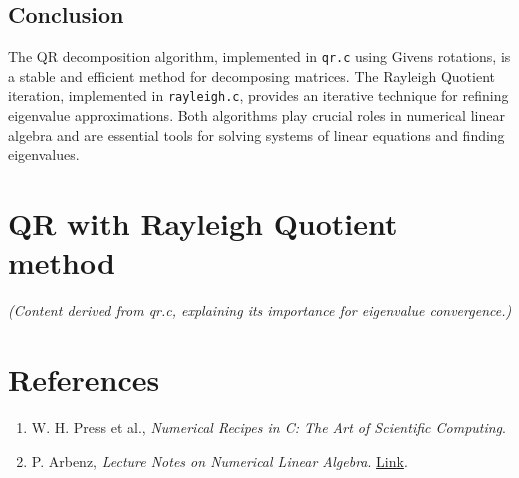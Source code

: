 \documentclass[a4paper,12pt]{article}
\theoremstyle{remark}
\begin{document}
\subsection{Conclusion}
The QR decomposition algorithm, implemented in \texttt{qr.c} using Givens rotations, is a stable and efficient method for decomposing matrices. The Rayleigh Quotient iteration, implemented in \texttt{rayleigh.c}, provides an iterative technique for refining eigenvalue approximations. Both algorithms play crucial roles in numerical linear algebra and are essential tools for solving systems of linear equations and finding eigenvalues.

\section{QR with Rayleigh Quotient method}
\textit{(Content derived from qr.c, explaining its importance for eigenvalue convergence.)}

\section*{References}
\begin{enumerate}
    \item W. H. Press et al., \textit{Numerical Recipes in C: The Art of Scientific Computing}.
    \item P. Arbenz, \textit{Lecture Notes on Numerical Linear Algebra}. 
        \href{https://people.inf.ethz.ch/arbenz/ewp/Lnotes/chapter4.pdf}{Link}.
\end{enumerate}
\end{document}

